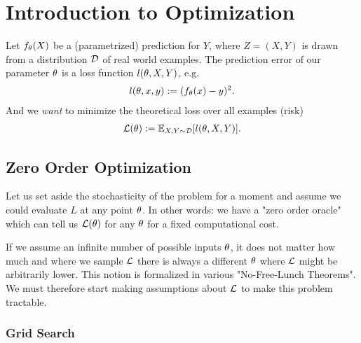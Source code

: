 
\chapter{Introduction to Optimization}


Let \(f_{\theta}(X)\) be a (parametrized) prediction for \(Y\), where \(Z=(X,Y)\)
is drawn from a distribution \(\mathcal{D}\) of real world examples. The prediction
error of our parameter \(\theta\) is a loss function \(l(\theta, X, Y)\), e.g. 
%
\begin{align*}
	l(\theta, x, y) := (f_{\theta}(x) - y)^2.
\end{align*}
%
And we \emph{want} to minimize the theoretical loss over all examples (risk)
%
\begin{align*}
	\mathcal{L}(\theta) := \mathbb{E}_{X,Y\sim \mathcal{D}} [l(\theta, X, Y)].
\end{align*}

\section{Zero Order Optimization}

Let us set aside the stochasticity of the problem for a moment and assume we
could evaluate \(L\) at any point \(\theta\). In other words: we have a "zero
order oracle" which can tell us \(\mathcal{L}(\theta)\) for any \(\theta\) for a fixed
computational cost.

If we assume an infinite number of possible inputs \(\theta\), it does not matter
how much and where we sample \(\mathcal{L}\) there is always a different \(\theta\) where
\(\mathcal{L}\) might be arbitrarily lower. This notion is formalized in various "No-Free-Lunch
Theorems". We must therefore start making assumptions about \(\mathcal{L}\) to make this
problem tractable.

\subsection{Grid Search}



